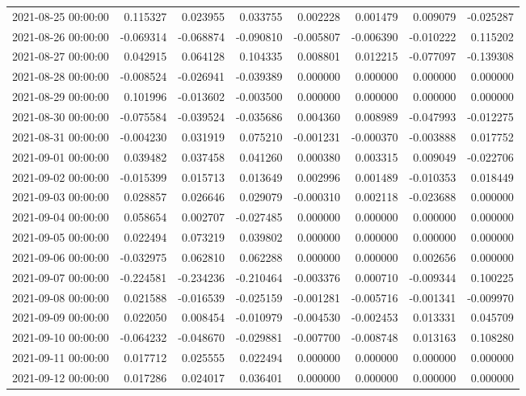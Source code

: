 \begin{tabular}{lrrrrrrr}
2021-08-25 00:00:00 & 0.115327 & 0.023955 & 0.033755 & 0.002228 & 0.001479 & 0.009079 & -0.025287 \\
2021-08-26 00:00:00 & -0.069314 & -0.068874 & -0.090810 & -0.005807 & -0.006390 & -0.010222 & 0.115202 \\
2021-08-27 00:00:00 & 0.042915 & 0.064128 & 0.104335 & 0.008801 & 0.012215 & -0.077097 & -0.139308 \\
2021-08-28 00:00:00 & -0.008524 & -0.026941 & -0.039389 & 0.000000 & 0.000000 & 0.000000 & 0.000000 \\
2021-08-29 00:00:00 & 0.101996 & -0.013602 & -0.003500 & 0.000000 & 0.000000 & 0.000000 & 0.000000 \\
2021-08-30 00:00:00 & -0.075584 & -0.039524 & -0.035686 & 0.004360 & 0.008989 & -0.047993 & -0.012275 \\
2021-08-31 00:00:00 & -0.004230 & 0.031919 & 0.075210 & -0.001231 & -0.000370 & -0.003888 & 0.017752 \\
2021-09-01 00:00:00 & 0.039482 & 0.037458 & 0.041260 & 0.000380 & 0.003315 & 0.009049 & -0.022706 \\
2021-09-02 00:00:00 & -0.015399 & 0.015713 & 0.013649 & 0.002996 & 0.001489 & -0.010353 & 0.018449 \\
2021-09-03 00:00:00 & 0.028857 & 0.026646 & 0.029079 & -0.000310 & 0.002118 & -0.023688 & 0.000000 \\
2021-09-04 00:00:00 & 0.058654 & 0.002707 & -0.027485 & 0.000000 & 0.000000 & 0.000000 & 0.000000 \\
2021-09-05 00:00:00 & 0.022494 & 0.073219 & 0.039802 & 0.000000 & 0.000000 & 0.000000 & 0.000000 \\
2021-09-06 00:00:00 & -0.032975 & 0.062810 & 0.062288 & 0.000000 & 0.000000 & 0.002656 & 0.000000 \\
2021-09-07 00:00:00 & -0.224581 & -0.234236 & -0.210464 & -0.003376 & 0.000710 & -0.009344 & 0.100225 \\
2021-09-08 00:00:00 & 0.021588 & -0.016539 & -0.025159 & -0.001281 & -0.005716 & -0.001341 & -0.009970 \\
2021-09-09 00:00:00 & 0.022050 & 0.008454 & -0.010979 & -0.004530 & -0.002453 & 0.013331 & 0.045709 \\
2021-09-10 00:00:00 & -0.064232 & -0.048670 & -0.029881 & -0.007700 & -0.008748 & 0.013163 & 0.108280 \\
2021-09-11 00:00:00 & 0.017712 & 0.025555 & 0.022494 & 0.000000 & 0.000000 & 0.000000 & 0.000000 \\
2021-09-12 00:00:00 & 0.017286 & 0.024017 & 0.036401 & 0.000000 & 0.000000 & 0.000000 & 0.000000 \\

\end{tabular}
